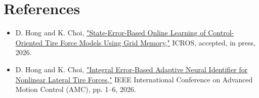 \documentclass[a4paper]{article}
\begin{document}
\section{References}

\small
\begin{itemize}
  \setlength{\itemsep}{0pt}
  \setlength{\parskip}{0pt}
  \item D. Hong and K. Choi, \href{
  https://kaist-mic-lab.github.io/static/pub/2026-state-error-based-online-learning.pdf
  }{"State-Error-Based Online Learning of Control-Oriented Tire Force Models
  Using Grid Memory,"} ICROS, accepted, in press, 2026.
  \item D. Hong and K. Choi, \href{
  https://kaist-mic-lab.github.io/static/pub/2025-integral-error-based-adaptive.pdf
  }{"Integral Error-Based Adaptive Neural Identifier for Nonlinear Lateral
  Tire Forces,"} IEEE International Conference on Advanced Motion Control
  (AMC), pp. 1--6, 2026.
\end{itemize}
\end{document}
